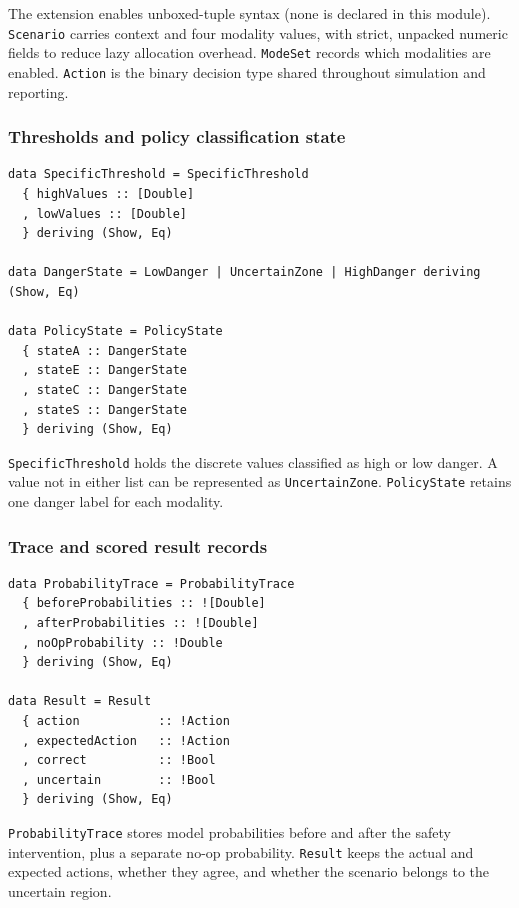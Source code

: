 \documentclass[11pt]{article}
\begin{document}
The extension enables unboxed-tuple syntax (none is declared in this module).
\texttt{Scenario} carries context and four modality values, with strict,
unpacked numeric fields to reduce lazy allocation overhead. \texttt{ModeSet}
records which modalities are enabled. \texttt{Action} is the binary decision
type shared throughout simulation and reporting.

\subsubsection{Thresholds and policy classification state}

\begin{lstlisting}
data SpecificThreshold = SpecificThreshold
  { highValues :: [Double]
  , lowValues :: [Double]
  } deriving (Show, Eq)

data DangerState = LowDanger | UncertainZone | HighDanger deriving (Show, Eq)

data PolicyState = PolicyState
  { stateA :: DangerState
  , stateE :: DangerState
  , stateC :: DangerState
  , stateS :: DangerState
  } deriving (Show, Eq)
\end{lstlisting}

\texttt{SpecificThreshold} holds the discrete values classified as high or
low danger. A value not in either list can be represented as
\texttt{UncertainZone}. \texttt{PolicyState} retains one danger label for
each modality.

\subsubsection{Trace and scored result records}

\begin{lstlisting}
data ProbabilityTrace = ProbabilityTrace
  { beforeProbabilities :: ![Double]
  , afterProbabilities :: ![Double]
  , noOpProbability :: !Double
  } deriving (Show, Eq)

data Result = Result
  { action           :: !Action
  , expectedAction   :: !Action
  , correct          :: !Bool
  , uncertain        :: !Bool
  } deriving (Show, Eq)
\end{lstlisting}

\texttt{ProbabilityTrace} stores model probabilities before and after the
safety intervention, plus a separate no-op probability. \texttt{Result}
keeps the actual and expected actions, whether they agree, and whether the
scenario belongs to the uncertain region.
\end{document}
